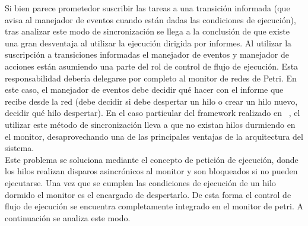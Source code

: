 Si bien parece prometedor suscribir las tareas a una transición informada (que
avisa al manejador de eventos cuando están dadas las condiciones de ejecución),
tras analizar este modo de sincronización se llega a la conclusión de que existe
una gran desventaja al utilizar la ejecución dirigida por informes. Al utilizar la
suscripción a transiciones informadas el manejador de eventos y manejador de
acciones están asumiendo una parte del rol de control de flujo de ejecución.
Esta responsabilidad debería delegarse por completo al monitor de redes de
Petri. En este caso, el manejador de eventos debe decidir qué hacer con el informe que
recibe desde la red (debe decidir si debe despertar un hilo o crear un hilo
nuevo, decidir qué hilo despertar). En el caso particular del framework
realizado en ~\cite{chimp}, el utilizar este método de sincronización lleva a
que no existan hilos durmiendo en el monitor, desaprovechando una de las
principales ventajas de la arquitectura del sistema.
\\
Este problema se soluciona mediante el concepto de petición de ejecución, donde
los hilos realizan disparos asincrónicos al monitor y son bloqueados si no
pueden ejecutarse. Una vez que se cumplen las condiciones de ejecución de un
hilo dormido el monitor es el encargado de despertarlo. De esta forma el control
de flujo de ejecución se encuentra completamente integrado en el monitor de
petri. A continuación se analiza este modo.

